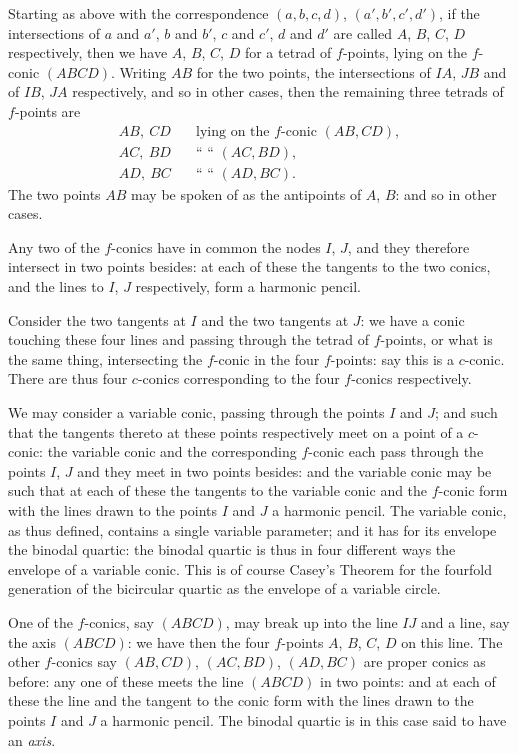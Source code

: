 \documentclass[11pt,a4paper]{article}
\begin{document}
Starting as above with the correspondence $(a, b, c, d)$, $(a', b', c', d')$, if the intersections of $a$ and $a'$, $b$ and $b'$, $c$ and $c'$, $d$ and $d'$ are called $A$, $B$, $C$, $D$ respectively, then we have $A$, $B$, $C$, $D$ for a tetrad of $f$-points, lying on the $f$-conic $(ABCD)$. Writing $AB$ for the two points, the intersections of $IA$, $JB$ and of $IB$, $JA$ respectively, and so in other cases, then the remaining three tetrads of $f$-points are
\begin{align*}
AB,\ CD &\quad \text{lying on the $f$-conic } (AB, CD),\\
AC,\ BD &\quad \text{`` `` } (AC, BD),\\
AD,\ BC &\quad \text{`` `` } (AD, BC).
\end{align*}
The two points $AB$ may be spoken of as the antipoints of $A$, $B$: and so in other cases.

Any two of the $f$-conics have in common the nodes $I$, $J$, and they therefore intersect in two points besides: at each of these the tangents to the two conics, and the lines to $I$, $J$ respectively, form a harmonic pencil.

Consider the two tangents at $I$ and the two tangents at $J$: we have a conic touching these four lines and passing through the tetrad of $f$-points, or what is the same thing, intersecting the $f$-conic in the four $f$-points: say this is a $c$-conic. There are thus four $c$-conics corresponding to the four $f$-conics respectively.

We may consider a variable conic, passing through the points $I$ and $J$; and such that the tangents thereto at these points respectively meet on a point of a $c$-conic: the variable conic and the corresponding $f$-conic each pass through the points $I$, $J$ and they meet in two points besides: and the variable conic may be such that at each of these the tangents to the variable conic and the $f$-conic form with the lines drawn to the points $I$ and $J$ a harmonic pencil. The variable conic, as thus defined, contains a single variable parameter; and it has for its envelope the binodal quartic: the binodal quartic is thus in four different ways the envelope of a variable conic. This is of course Casey's Theorem for the fourfold generation of the bicircular quartic as the envelope of a variable circle.

One of the $f$-conics, say $(ABCD)$, may break up into the line $IJ$ and a line, say the axis $(ABCD)$: we have then the four $f$-points $A$, $B$, $C$, $D$ on this line. The other $f$-conics say $(AB, CD)$, $(AC, BD)$, $(AD, BC)$ are proper conics as before: any one of these meets the line $(ABCD)$ in two points: and at each of these the line and the tangent to the conic form with the lines drawn to the points $I$ and $J$ a harmonic pencil. The binodal quartic is in this case said to have an \emph{axis}.
\end{document}
